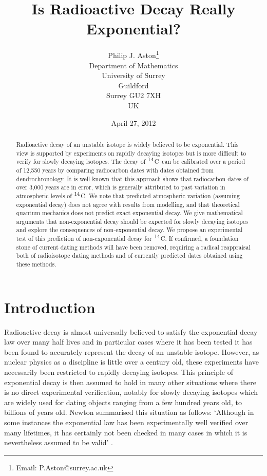 \documentclass[12pt]{article}
\title{Is Radioactive Decay Really Exponential?}
\author{Philip J. Aston\thanks{Email: P.Aston@surrey.ac.uk}\\
Department of Mathematics\\
University of Surrey\\
Guildford\\
Surrey GU2 7XH\\
UK}
\newcommand{\cft}{$^{\rm 14}$C}
\begin{document}
\date{April 27, 2012}
\maketitle

\begin{abstract}
Radioactive decay of an unstable isotope is widely believed to be 
exponential. This view is supported by experiments on rapidly decaying 
isotopes but is more difficult to verify for slowly decaying isotopes. 
The decay of \cft~can be calibrated over a period of 12,550 years by 
comparing radiocarbon dates with dates obtained from
dendrochronology. It is well known that this approach shows that
radiocarbon dates of over 3,000 years are in error, which is generally 
attributed to past variation in atmospheric levels of \cft. We note that
predicted atmospheric variation (assuming exponential decay) does not
agree with results from modelling, and that theoretical quantum mechanics
does not predict exact exponential decay. We give mathematical
arguments that non-exponential decay should be expected for slowly 
decaying isotopes and explore the consequences of non-exponential decay. 
We propose an experimental test of this
prediction of non-exponential decay for \cft. If confirmed, a foundation
stone of current dating methods will have been removed, requiring a 
radical reappraisal both of radioisotope dating methods and of 
currently predicted dates obtained using these methods.
\end{abstract}

\newpage

\section{Introduction}

Radioactive decay is almost universally believed to satisfy the exponential 
decay law over many half lives and in particular cases where it has been 
tested \cite{gopych84,norman88} it has been found to accurately represent the
decay of an unstable isotope. However, as nuclear physics as a discipline 
is little over a century old, these experiments have necessarily been 
restricted to rapidly decaying isotopes. This principle of exponential decay
is then assumed to hold in many other situations where there is no direct 
experimental verification, notably for slowly decaying isotopes which are 
widely used for dating objects ranging from a few hundred years
old, to billions of years old. Newton summarised this situation as follows:
`Although in some instances the exponential law has been experimentally well
verified over many lifetimes, it has certainly not been checked in many
cases in which it is nevertheless assumed to be valid' \cite[p608]{newton66}.
\end{document}
